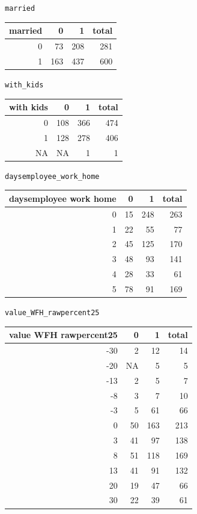 \documentclass[
  a4paper,
]{article}
\numberwithin{equation}{section}
\numberwithin{figure}{section}
\numberwithin{table}{section}
\begin{document}
\texttt{married}

\begin{table}[H]
\centering
\begin{tabular}{rrrr}
\toprule
married & 0 & 1 & total\\
\midrule
0 & 73 & 208 & 281\\
1 & 163 & 437 & 600\\
\bottomrule
\end{tabular}
\end{table}

\texttt{with\_kids}

\begin{table}[H]
\centering
\begin{tabular}{rrrr}
\toprule
with kids & 0 & 1 & total\\
\midrule
0 & 108 & 366 & 474\\
1 & 128 & 278 & 406\\
NA & NA & 1 & 1\\
\bottomrule
\end{tabular}
\end{table}

\texttt{daysemployee\_work\_home}

\begin{table}[H]
\centering
\begin{tabular}{rrrr}
\toprule
daysemployee work home & 0 & 1 & total\\
\midrule
0 & 15 & 248 & 263\\
1 & 22 & 55 & 77\\
2 & 45 & 125 & 170\\
3 & 48 & 93 & 141\\
4 & 28 & 33 & 61\\
5 & 78 & 91 & 169\\
\bottomrule
\end{tabular}
\end{table}

\texttt{value\_WFH\_rawpercent25}

\begin{table}[H]
\centering
\begin{tabular}{rrrr}
\toprule
value WFH rawpercent25 & 0 & 1 & total\\
\midrule
-30 & 2 & 12 & 14\\
-20 & NA & 5 & 5\\
-13 & 2 & 5 & 7\\
-8 & 3 & 7 & 10\\
-3 & 5 & 61 & 66\\
0 & 50 & 163 & 213\\
3 & 41 & 97 & 138\\
8 & 51 & 118 & 169\\
13 & 41 & 91 & 132\\
20 & 19 & 47 & 66\\
30 & 22 & 39 & 61\\
\bottomrule
\end{tabular}
\end{table}
\end{document}
